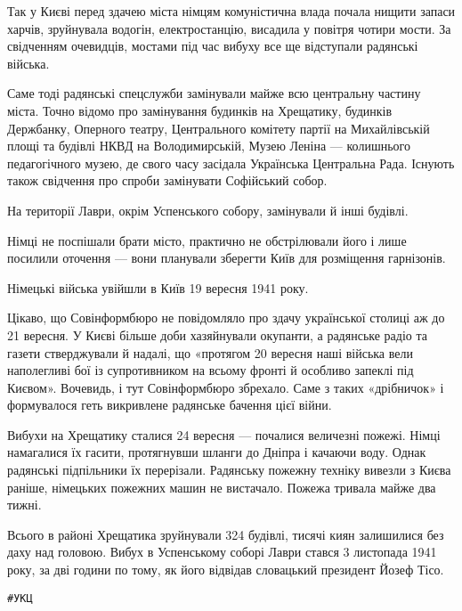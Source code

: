 Так у Києві перед здачею міста німцям комуністична влада почала нищити запаси
харчів, зруйнувала водогін, електростанцію, висадила у повітря чотири мости. За
свідченням очевидців, мостами під час вибуху все ще відступали радянські
війська.

Саме тоді радянські спецслужби замінували майже всю центральну частину міста.
Точно відомо про замінування будинків на Хрещатику, будинків Держбанку,
Оперного театру, Центрального комітету партії на Михайлівській площі та будівлі
НКВД на Володимирській, Музею Леніна — колишнього педагогічного музею, де свого
часу засідала Українська Центральна Рада. Існують також свідчення про спроби
замінувати Софійський собор.

На території Лаври, окрім Успенського собору, замінували й інші будівлі.

Німці не поспішали брати місто, практично не обстрілювали його і лише посилили
оточення — вони планували зберегти Київ для розміщення гарнізонів.

Німецькі війська увійшли в Київ 19 вересня 1941 року.

Цікаво, що Совінформбюро не повідомляло про здачу української столиці аж до 21
вересня. У Києві більше доби хазяйнували окупанти, а радянське радіо та газети
стверджували й надалі, що «протягом 20 вересня наші війська вели наполегливі
бої із супротивником на всьому фронті й особливо запеклі під Києвом». Вочевидь,
і тут Совінформбюро збрехало. Саме з таких «дрібничок» і формувалося геть
викривлене радянське бачення цієї війни.

Вибухи на Хрещатику сталися 24 вересня — почалися величезні пожежі. Німці
намагалися їх гасити, протягнувши шланги до Дніпра і качаючи воду. Однак
радянські підпільники їх перерізали. Радянську пожежну техніку вивезли з Києва
раніше, німецьких пожежних машин не вистачало. Пожежа тривала майже два тижні.

Всього в районі Хрещатика зруйнували 324 будівлі, тисячі киян залишилися без
даху над головою.  Вибух в Успенському соборі Лаври стався 3 листопада 1941
року, за дві години по тому, як його відвідав словацький президент Йозеф Тісо. 

\verb|#УКЦ|
